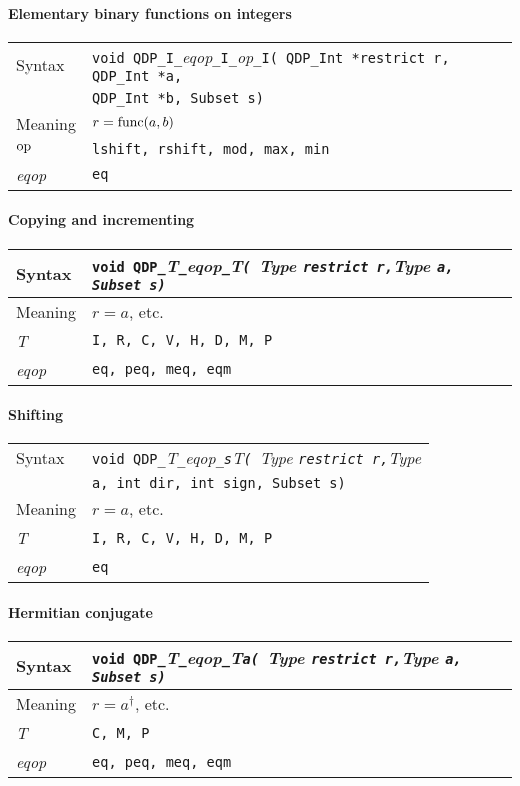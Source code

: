 \documentclass{article}
\newcommand{\op}{\mathop{\rm op}}
\newcommand{\tInt}{QDP\ttdash Int }
\newcommand{\namespace}{QDP}
\newcommand{\allEqOps}{{\tt eq, peq, meq, eqm}}
\newcommand{\allNumericTypes}{{\tt I, R, C, V, H, D, M, P}}
\newcommand{\ttdash}{{\tt \_}}
\newcommand{\itt}{\it T}
\newcommand{\extraarg}{, Subset s}
\newcommand{\protoUnary}{{\tt void \namespace}\ttdash\itt\ttdash{\it eqop}\ttdash\itt{\tt ( }{\it Type }{\tt *restrict r,}{\it Type }{\tt *a\extraarg)}}
\newcommand{\protoUnaryA}{{\tt void \namespace}\ttdash\itt\ttdash{\it eqop}\ttdash\itt{\tt a( }{\it Type }{\tt *restrict r,}{\it Type }{\tt *a\extraarg)}}
\newcommand{\protoUnaryShift}{{\tt void \namespace}\ttdash\itt\ttdash{\it eqop}\ttdash{\tt s}\itt{\tt ( }{\it Type }{\tt *restrict r,}{\it Type } \\
 & {\tt *a, int dir, int sign\extraarg)}}
\newcommand{\shift}{
\paragraph{Shifting}

\begin{flushleft}
  \begin{tabular}{|l|l|}
  \hline
  Syntax      & \protoUnaryShift  \\
  \hline
  Meaning     & $r = a$, etc. \\
  \hline
  \itt     & \allNumericTypes \\
  \hline
  {\it eqop}  & {\tt eq} \\
  \hline
  \end{tabular}
\end{flushleft}

}
\begin{document}
\paragraph{Elementary binary functions on integers}

\begin{flushleft}
  \begin{tabular}{|l|l|}
  \hline
  Syntax      & {\tt void \namespace}\ttdash{\tt I}\ttdash{\it eqop}\ttdash{\tt I}\ttdash{\it op}\ttdash{\tt I( \tInt *restrict r, \tInt *a,} \\
              & {\tt \tInt *b\extraarg)} \\
  \hline
  Meaning     & $r = {\rm func}(a,b)$\\
  \hline
  $\op$       & {\tt lshift, rshift, mod, max, min} \\
  \hline
  {\it eqop}  & {\tt eq} \\
  \hline
  \end{tabular}
\end{flushleft}

\paragraph{Copying and incrementing}

\begin{flushleft}
  \begin{tabular}{|l|l|}
  \hline
  Syntax      & \protoUnary  \\
  \hline
  Meaning     & $r = a$, etc. \\
  \hline
  \itt     & \allNumericTypes \\
  \hline
  {\it eqop}  & \allEqOps \\
  \hline
  \end{tabular}
\end{flushleft}

\shift

\paragraph{Hermitian conjugate}

\begin{flushleft}
  \begin{tabular}{|l|l|}
  \hline
  Syntax      & \protoUnaryA  \\
  \hline
  Meaning     & $r = a^\dagger$, etc. \\
  \hline
  \itt     & {\tt C, M, P} \\
  \hline
  {\it eqop}  & \allEqOps \\
  \hline
  \end{tabular}
\end{flushleft}
\end{document}
